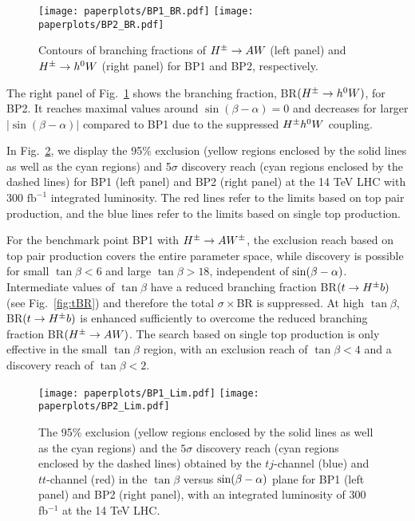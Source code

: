  \begin{figure}[h!]
 \centering
 	\texttt{[image: paperplots/BP1\_BR.pdf]}
	\texttt{[image: paperplots/BP2\_BR.pdf]}
\caption{Contours of branching fractions of $H^{\pm} \to AW$ (left  panel) and $ H^{\pm} \to h^0 W$ (right  panel) for BP1 and BP2,  respectively. }
\label{fig:imp_BP_BR}
\end{figure}

The right panel of Fig.~\ref{fig:imp_BP_BR} shows the branching fraction, BR$(H^{\pm} \to h^0W)$, for BP2. It reaches maximal  values around $\sin(\beta-\alpha)=0$ and decreases for larger $|\sin(\beta-\alpha)|$ compared to BP1 due to the suppressed $H^{\pm} h^0 W$ coupling. 

In Fig.~\ref{fig:imp_BP_Lim}, we display the 95\% exclusion (yellow regions enclosed by the solid lines as well as the cyan regions)  and 5$\sigma$ discovery reach (cyan regions enclosed by the dashed lines) for BP1 (left panel)  and BP2 (right panel) at the 14 TeV LHC with 300 $\text{fb}^{-1}$ integrated luminosity.    The red lines refer to the limits based on top pair production, and the blue lines refer to the limits based on single top production.     

 For  the benchmark point  BP1 with $H^{\pm} \rightarrow AW^{\pm}$, the exclusion reach based on top pair production  covers the entire parameter space, while   discovery   is  possible for small $\tan\beta<6$ and  large $\tan\beta>18$,  independent of $\sin(\beta-\alpha)$. Intermediate values of $\tan\beta$ have a reduced branching fraction BR$(t \to H^{\pm} b)$ (see Fig.~\ref{fig:tBR}) and therefore the total $\sigma \times$BR is suppressed. At high $\tan\beta$,   BR$(t \to H^{\pm} b)$ is enhanced sufficiently to overcome the reduced branching fraction BR$(H^{\pm} \rightarrow  AW)$.  The search based on single top production is only effective in the small $\tan\beta$ region, with an exclusion reach of $\tan\beta <4$ and a discovery reach of $\tan\beta<2$.   

 \begin{figure}[h!]
 \centering
 	\texttt{[image: paperplots/BP1\_Lim.pdf]}
	\texttt{[image: paperplots/BP2\_Lim.pdf]}
\caption{The 95\% exclusion (yellow regions enclosed by the solid lines as well as the cyan regions) and the $5\sigma$ discovery reach (cyan regions enclosed by the dashed lines) obtained by the $tj$-channel (blue) and $tt$-channel (red) in the $\tan\beta$ versus $\sin(\beta-\alpha)$  plane for BP1 (left panel) and BP2 (right panel), with an integrated luminosity of 300 fb$^{-1}$ at the 14 TeV LHC.  }
\label{fig:imp_BP_Lim}
\end{figure}


